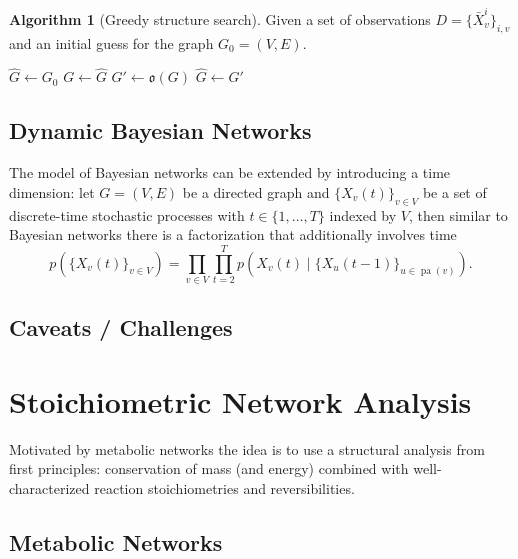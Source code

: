 \documentclass[a4paper]{article}
\newcommand{\given}{\mid}
\DeclareMathOperator{\pa}{pa} %
\theoremstyle{plain}
\theoremstyle{definition}
\newtheorem{alg}{Algorithm}[section]
\theoremstyle{remark}
\begin{document}
\begin{alg}[Greedy structure search]
  Given a set of observations $D = \{\bar{X}_v^i\}_{i,v}$ and an initial guess
  for the graph $G_0 = (V,E)$.
  \begin{algorithmic}
      \State $\hat{G} \gets G_0$
      \Repeat
        \State $G \gets \hat{G}$
        \State {}
          \State $G' \gets \mathfrak{o}(G)$
              \State $\hat{G} \gets G'$
            \EndIf
          \EndIf
        \EndFor
    \EndFunction
  \end{algorithmic}
\end{alg}

\subsection{Dynamic Bayesian Networks}

The model of Bayesian networks can be extended by introducing a time
dimension: let $G = (V,E)$ be a directed graph and $\{X_v(t)\}_{v\in V}$ be a
set of discrete-time stochastic processes with $t \in \{1,\ldots, T\}$ indexed
by $V$, then similar to Bayesian networks there is a factorization that
additionally involves time
\[
  p(\{X_v(t)\}_{v \in V})
    = \prod_{v \in V} \prod_{t=2}^T p(X_v(t) \given 
      \{X_u(t-1)\}_{u \in \pa(v)}).
\]

\subsection{Caveats / Challenges}


\section{Stoichiometric Network Analysis}

Motivated by metabolic networks the idea is to use a structural analysis from
first principles: conservation of mass (and energy) combined with
well-characterized reaction stoichiometries and reversibilities.


\subsection{Metabolic Networks}
\end{document}
